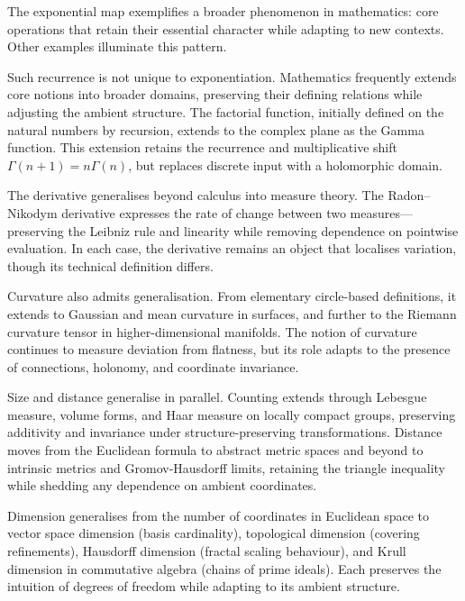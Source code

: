 \begin{commentary}[Generalisations]
The exponential map exemplifies a broader phenomenon in mathematics: core operations that retain their essential character while adapting to new contexts. Other examples illuminate this pattern.

Such recurrence is not unique to exponentiation. Mathematics frequently extends core notions into broader domains, preserving their defining relations while adjusting the ambient structure. The factorial function, initially defined on the natural numbers by recursion, extends to the complex plane as the Gamma function. This extension retains the recurrence and multiplicative shift \( \Gamma(n+1) = n\Gamma(n) \), but replaces discrete input with a holomorphic domain.

The derivative generalises beyond calculus into measure theory. The Radon–Nikodym derivative expresses the rate of change between two measures—preserving the Leibniz rule and linearity while removing dependence on pointwise evaluation. In each case, the derivative remains an object that localises variation, though its technical definition differs.

Curvature also admits generalisation. From elementary circle-based definitions, it extends to Gaussian and mean curvature in surfaces, and further to the Riemann curvature tensor in higher-dimensional manifolds. The notion of curvature continues to measure deviation from flatness, but its role adapts to the presence of connections, holonomy, and coordinate invariance.

Size and distance generalise in parallel. Counting extends through Lebesgue measure, volume forms, and Haar measure on locally compact groups, preserving additivity and invariance under structure-preserving transformations. Distance moves from the Euclidean formula to abstract metric spaces and beyond to intrinsic metrics and Gromov-Hausdorff limits, retaining the triangle inequality while shedding any dependence on ambient coordinates.

Dimension generalises from the number of coordinates in Euclidean space to vector space dimension (basis cardinality), topological dimension (covering refinements), Hausdorff dimension (fractal scaling behaviour), and Krull dimension in commutative algebra (chains of prime ideals). Each preserves the intuition of \QSOpen{}degrees of freedom\QSClose{} while adapting to its ambient structure.

\end{commentary}

